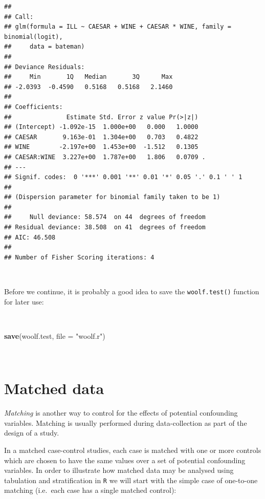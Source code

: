 \documentclass[12pt,a4paper]{book}
\newenvironment{Shaded}{\begin{snugshade}}{\end{snugshade}}
\newcommand{\DataTypeTok}[1]{\textcolor[rgb]{0.13,0.29,0.53}{#1}}
\newcommand{\KeywordTok}[1]{\textcolor[rgb]{0.13,0.29,0.53}{\textbf{#1}}}
\newcommand{\NormalTok}[1]{#1}
\newcommand{\StringTok}[1]{\textcolor[rgb]{0.31,0.60,0.02}{#1}}
\theoremstyle{definition}
\theoremstyle{definition}
\theoremstyle{definition}
\theoremstyle{remark}
\begin{document}
\begin{verbatim}
## 
## Call:
## glm(formula = ILL ~ CAESAR + WINE + CAESAR * WINE, family = binomial(logit), 
##     data = bateman)
## 
## Deviance Residuals: 
##     Min       1Q   Median       3Q      Max  
## -2.0393  -0.4590   0.5168   0.5168   2.1460  
## 
## Coefficients:
##               Estimate Std. Error z value Pr(>|z|)  
## (Intercept) -1.092e-15  1.000e+00   0.000   1.0000  
## CAESAR       9.163e-01  1.304e+00   0.703   0.4822  
## WINE        -2.197e+00  1.453e+00  -1.512   0.1305  
## CAESAR:WINE  3.227e+00  1.787e+00   1.806   0.0709 .
## ---
## Signif. codes:  0 '***' 0.001 '**' 0.01 '*' 0.05 '.' 0.1 ' ' 1
## 
## (Dispersion parameter for binomial family taken to be 1)
## 
##     Null deviance: 58.574  on 44  degrees of freedom
## Residual deviance: 38.508  on 41  degrees of freedom
## AIC: 46.508
## 
## Number of Fisher Scoring iterations: 4
\end{verbatim}

~

Before we continue, it is probably a good idea to save the
\texttt{woolf.test()} function for later use:

~

\begin{Shaded}
\begin{Highlighting}[]
\KeywordTok{save}\NormalTok{(woolf.test, }\DataTypeTok{file =} \StringTok{"woolf.r"}\NormalTok{)}
\end{Highlighting}
\end{Shaded}

~

\hypertarget{matched-data}{%
\section{Matched data}\label{matched-data}}

\emph{Matching} is another way to control for the effects of potential
confounding variables. Matching is usually performed during
data-collection as part of the design of a study.

In a matched case-control studies, each case is matched with one or more
controls which are chosen to have the same values over a set of
potential confounding variables. In order to illustrate how matched data
may be analysed using tabulation and stratification in \texttt{R} we
will start with the simple case of one-to-one matching (i.e.~each case
has a single matched control):

~
\end{document}
